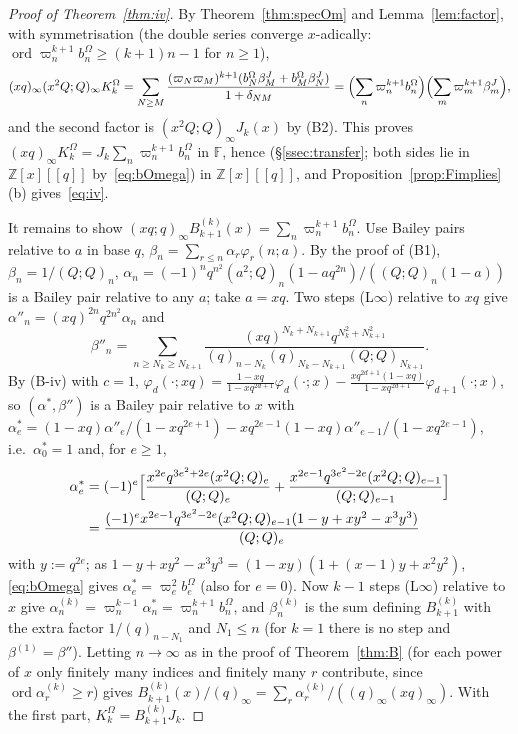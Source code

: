\documentclass[11pt]{amsart}
\theoremstyle{definition}
\numberwithin{equation}{section}
\newcommand{\Z}{\mathbb{Z}}
\begin{document}
\begin{proof}[Proof of Theorem~\ref{thm:iv}]
By Theorem~\ref{thm:specOm} and Lemma~\ref{lem:factor}, with symmetrisation (the double series converge $x$-adically:
$\operatorname{ord}\varpi_n^{k+1}b^\Omega_n\ge(k+1)n-1$ for $n\ge1$),
\[(xq)_\infty(x^2Q;Q)_\infty K^\Omega_k=\sum_{N\ge M}\frac{(\varpi_N\varpi_M)^{k+1}(b^\Omega_N\beta^J_M+b^\Omega_M\beta^J_N)}{1+\delta_{NM}}
=\Bigl(\sum_n\varpi_n^{k+1}b^\Omega_n\Bigr)\Bigl(\sum_m\varpi_m^{k+1}\beta^J_m\Bigr),\]
and the second factor is $(x^2Q;Q)_\infty J_k(x)$ by (B2). This proves
$(xq)_\infty K^\Omega_k=J_k\sum_n\varpi_n^{k+1}b^\Omega_n$ in $\mathbb F$, hence (§\ref{ssec:transfer}; both sides lie in
$\Z[x][[q]]$ by~\eqref{eq:bOmega}) in $\Z[x][[q]]$, and Proposition~\ref{prop:Fimplies}(b) gives~\eqref{eq:iv}.

It remains to show $(xq;q)_\infty B^{(k)}_{k+1}(x)=\sum_n\varpi_n^{k+1}b^\Omega_n$. Use Bailey pairs relative to $a$ in base $q$,
$\beta_n=\sum_{r\le n}\alpha_r\varphi_r(n;a)$. By the proof of (B1), $\beta_n=1/(Q;Q)_n$,
$\alpha_n=(-1)^nq^{n^2}(a^2;Q)_n(1-aq^{2n})/((Q;Q)_n(1-a))$ is a Bailey pair relative to any $a$; take $a=xq$. Two steps
(L$\infty$) relative to $xq$ give $\alpha''_n=(xq)^{2n}q^{2n^2}\alpha_n$ and
\[\beta''_n=\sum_{n\ge N_k\ge N_{k+1}}\frac{(xq)^{N_k+N_{k+1}}q^{N_k^2+N_{k+1}^2}}{(q)_{n-N_k}(q)_{N_k-N_{k+1}}(Q;Q)_{N_{k+1}}}.\]
By (B-iv) with $c=1$,
$\varphi_d(\cdot;xq)=\frac{1-xq}{1-xq^{2d+1}}\varphi_d(\cdot;x)-\frac{xq^{2d+1}(1-xq)}{1-xq^{2d+1}}\varphi_{d+1}(\cdot;x)$, so
$(\alpha^*,\beta'')$ is a Bailey pair relative to $x$ with
$\alpha^*_e=(1-xq)\alpha''_e/(1-xq^{2e+1})-xq^{2e-1}(1-xq)\alpha''_{e-1}/(1-xq^{2e-1})$, i.e.\ $\alpha^*_0=1$ and, for $e\ge1$,
\begin{align*}
\alpha^*_e&=(-1)^e\Bigl[\frac{x^{2e}q^{3e^2+2e}(x^2Q;Q)_e}{(Q;Q)_e}+\frac{x^{2e-1}q^{3e^2-2e}(x^2Q;Q)_{e-1}}{(Q;Q)_{e-1}}\Bigr]\\
&=\frac{(-1)^ex^{2e-1}q^{3e^2-2e}(x^2Q;Q)_{e-1}(1-y+xy^2-x^3y^3)}{(Q;Q)_e}
\end{align*}
with $y:=q^{2e}$; as $1-y+xy^2-x^3y^3=(1-xy)(1+(x-1)y+x^2y^2)$, \eqref{eq:bOmega} gives $\alpha^*_e=\varpi_e^2b^\Omega_e$ (also for
$e=0$). Now $k-1$ steps (L$\infty$) relative to $x$ give $\alpha^{(k)}_n=\varpi_n^{k-1}\alpha^*_n=\varpi_n^{k+1}b^\Omega_n$, and
$\beta^{(k)}_n$ is the sum defining $B^{(k)}_{k+1}$ with the extra factor $1/(q)_{n-N_1}$ and $N_1\le n$ (for $k=1$ there is
no step and $\beta^{(1)}=\beta''$). Letting $n\to\infty$ as in the proof of Theorem~\ref{thm:B} (for each power of $x$ only
finitely many indices and finitely many $r$ contribute, since $\operatorname{ord}\alpha^{(k)}_r\ge r$) gives
$B^{(k)}_{k+1}(x)/(q)_\infty=\sum_r\alpha^{(k)}_r/((q)_\infty(xq)_\infty)$. With the first part,
$K^\Omega_k=B^{(k)}_{k+1}J_k$.
\end{proof}
\end{document}
